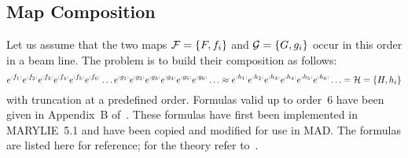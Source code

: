 \subsection{Map Composition} 
Let us assume that the two maps ${\cal F} = \{F, f_i\}$ and
${\cal G} = \{G, g_i\}$ occur in this order in a beam line.
The problem is to build their composition as follows:
\[
e^{{:}{f_1}{:}} e^{{:}{f_2}{:}} e^{{:}{f_3}{:}} e^{{:}{f_4}{:}} e^{{:}{f_5}{:}}
e^{{:}{f_6}{:}} \ldots
e^{{:}{g_1}{:}} e^{{:}{g_2}{:}} e^{{:}{g_3}{:}} e^{{:}{g_4}{:}} e^{{:}{g_5}{:}}
e^{{:}{g_6}{:}} \ldots\approx
e^{{:}{h_1}{:}} e^{{:}{h_2}{:}} e^{{:}{h_3}{:}} e^{{:}{h_4}{:}} e^{{:}{h_5}{:}}
e^{{:}{h_6}{:}} \ldots = {\cal H} = \{H, h_i\}
\]
with truncation at a predefined order.
Formulas valid up to order~$6$ have been given in Appendix~B
of~\cite{HEA88}.
These formulas have first been implemented in MARYLIE~5.1 and have
been copied and modified for use in MAD.
The formulas are listed here for reference;
for the theory refer to~\cite{HEA88}.

